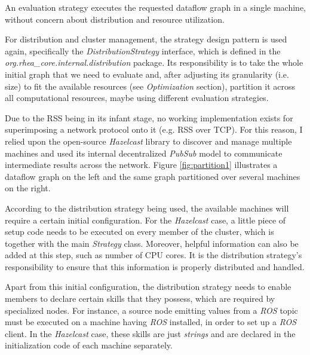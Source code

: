 \documentclass{dithesis}
\begin{document}

An evaluation strategy executes the requested dataflow graph in a single machine, without concern about distribution and resource utilization.

For distribution and cluster management, the strategy design pattern is used again, specifically the \textit{DistributionStrategy} interface, which is defined in the \textit{org.rhea\_core.internal.distribution} package. Its responsibility is to take the whole initial graph that we need to evaluate and, after adjusting its granularity (i.e. size) to fit the available resources (see \textit{Optimization} section), partition it across all computational resources, maybe using different evaluation strategies.


Due to the RSS being in its infant stage, no working implementation exists for superimposing a network protocol onto it (e.g. RSS over TCP). For this reason, I relied upon the open-source \textit{Hazelcast} library\cite{hazelcast} to discover and manage multiple machines and used its internal decentralized \textit{PubSub} model to communicate intermediate results across the network. Figure \ref{fig:partition1} illustrates a dataflow graph on the left and the same graph partitioned over several machines on the right.



According to the distribution strategy being used, the available machines will require a certain initial configuration. For the \textit{Hazelcast} case, a little piece of setup code needs to be executed on every member of the cluster, which is together with the main \textit{Strategy} class. Moreover, helpful information can also be added at this step, such as number of CPU cores. It is the distribution strategy's responsibility to ensure that this information is properly distributed and handled.

Apart from this initial configuration, the distribution strategy needs to enable members to declare certain skills that they possess, which are required by specialized nodes. For instance, a source node emitting values from a \textit{ROS} topic must be executed on a machine having \textit{ROS} installed, in order to set up a \textit{ROS} client. In the \textit{Hazelcast} case, these skills are just \textit{strings} and are declared in the initialization code of each machine separately.
\end{document}
